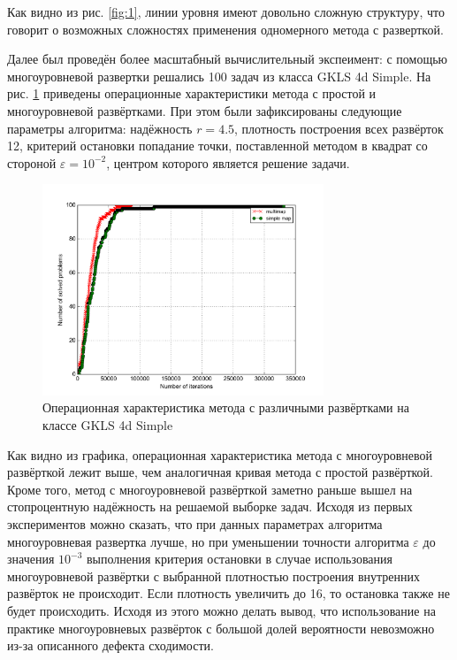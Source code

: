 Как видно из рис. \ref{fig:1}, линии уровня имеют довольно сложную структуру, что говорит о возможных сложностях применения одномерного метода с разверткой.
\par
Далее был проведён более масштабный вычислительный экспеимент: с помощью многоуровневой развертки решались 100 задач из класса GKLS 4d Simple. На рис. \ref{fig:multimapOP} приведены операционные
характеристики метода с простой и многоуровневой развёртками. При этом были зафиксированы следующие параметры алгоритма: надёжность \(r=4.5\), плотность построения всех развёрток 12, критерий остановки попадание
точки, поставленной методом в квадрат со стороной \(\varepsilon=10^{-2}\), центром которого является решение задачи.
\begin{figure}[ht]
  \center
  \includegraphics[width=0.75\textwidth]{images/multimap_op.png}
  \caption{Операционная характеристика метода с различными развёртками на классе GKLS 4d Simple}
  \label{fig:multimapOP}
\end{figure}
Как видно из графика, операционная характеристика метода с многоуровневой развёрткой лежит выше, чем аналогичная кривая метода с простой развёрткой. Кроме того, метод с многоуровневой развёрткой
заметно раньше вышел на стопроцентную надёжность на решаемой выборке задач. Исходя из первых экспериментов можно сказать, что при данных параметрах алгоритма многоуровневая развертка лучше, но
при уменьшении точности алгоритма \(\varepsilon\) до значения \(10^{-3}\) выполнения критерия остановки в случае использования многоуровневой развёртки с выбранной плотностью построения внутренних развёрток не происходит.
Если плотность увеличить до 16, то остановка также не будет происходить. Исходя из этого можно делать вывод, что использование на практике многоуровневых развёрток с большой долей вероятности
невозможно из-за описанного дефекта сходимости.
